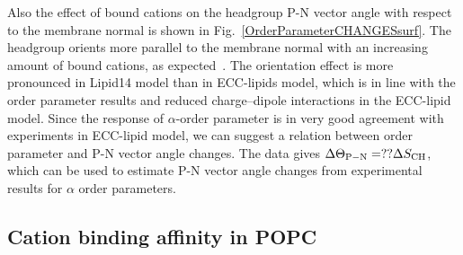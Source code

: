 \documentclass[aip,jcp,twocolumn]{revtex4}
\begin{document}
Also the effect of bound cations on the
headgroup P-N vector angle with respect to the membrane normal
is shown in Fig.~\ref{OrderParameterCHANGESsurf}.
The headgroup orients more parallel to the membrane
normal with an increasing amount of bound cations, as expected~\cite{seelig87}. 
The orientation effect is more pronounced in Lipid14 model than 
in ECC-lipids model, which is in line with the order parameter 
results and reduced charge--dipole interactions in the ECC-lipid model.
Since the response of $\alpha$-order parameter is in very good agreement
with experiments in ECC-lipid model, we can suggest a relation between
order parameter and P-N vector angle changes. The data gives
$\Delta \Theta_{\rm P-N}=?? \Delta S_{\rm CH}$, which can be used
to estimate P-N vector angle changes from experimental results
for $\alpha$ order parameters. 


\subsection{Cation binding affinity in POPC}
\end{document}
